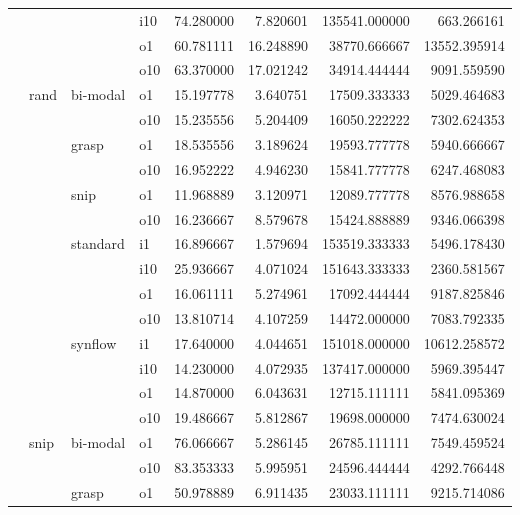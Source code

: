 \begin{longtable}{llllrrrr}
      &     &         & i10 &  74.280000 &   7.820601 &    135541.000000 &    663.266161 \\
      &     &         & o1 &  60.781111 &  16.248890 &     38770.666667 &  13552.395914 \\
      &     &         & o10 &  63.370000 &  17.021242 &     34914.444444 &   9091.559590 \\
      & rand & bi-modal & o1 &  15.197778 &   3.640751 &     17509.333333 &   5029.464683 \\
      &     &         & o10 &  15.235556 &   5.204409 &     16050.222222 &   7302.624353 \\
      &     & grasp & o1 &  18.535556 &   3.189624 &     19593.777778 &   5940.666667 \\
      &     &         & o10 &  16.952222 &   4.946230 &     15841.777778 &   6247.468083 \\
      &     & snip & o1 &  11.968889 &   3.120971 &     12089.777778 &   8576.988658 \\
      &     &         & o10 &  16.236667 &   8.579678 &     15424.888889 &   9346.066398 \\
      &     & standard & i1 &  16.896667 &   1.579694 &    153519.333333 &   5496.178430 \\
      &     &         & i10 &  25.936667 &   4.071024 &    151643.333333 &   2360.581567 \\
      &     &         & o1 &  16.061111 &   5.274961 &     17092.444444 &   9187.825846 \\
      &     &         & o10 &  13.810714 &   4.107259 &     14472.000000 &   7083.792335 \\
      &     & synflow & i1 &  17.640000 &   4.044651 &    151018.000000 &  10612.258572 \\
      &     &         & i10 &  14.230000 &   4.072935 &    137417.000000 &   5969.395447 \\
      &     &         & o1 &  14.870000 &   6.043631 &     12715.111111 &   5841.095369 \\
      &     &         & o10 &  19.486667 &   5.812867 &     19698.000000 &   7474.630024 \\
      & snip & bi-modal & o1 &  76.066667 &   5.286145 &     26785.111111 &   7549.459524 \\
      &     &         & o10 &  83.353333 &   5.995951 &     24596.444444 &   4292.766448 \\
      &     & grasp & o1 &  50.978889 &   6.911435 &     23033.111111 &   9215.714086 \\

\end{longtable}
